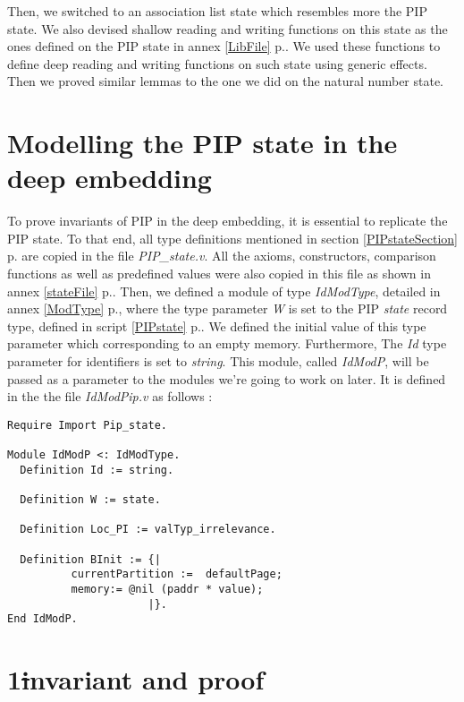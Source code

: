 Then, we switched to an association list state which resembles more the PIP state. We also devised shallow reading and writing functions on this state as the ones defined on the PIP state in annex \ref{LibFile} p.\pageref{LibFile}. We used these functions to define deep reading and writing functions on such state using generic effects. Then we proved similar lemmas to the one we did on the natural number state. 
 
\section{Modelling the PIP state in the deep embedding}
To prove invariants of PIP in the deep embedding, it is essential to replicate the PIP state. To that end, all type definitions mentioned in section \ref{PIPstateSection} p.\pageref{PIPstateSection} are copied in the file \textit{PIP\_state.v}. All the axioms, constructors, comparison functions as well as predefined values were also copied in this file as shown in annex \ref{stateFile} p.\pageref{stateFile}. Then, we defined a module of type \textit{IdModType}, detailed in annex \ref{ModType} p.\pageref{ModType}, where the type parameter \textit{W} is set to the PIP \textit{state} record type, defined in script \ref{PIPstate} p.\pageref{PIPstate}. We defined the initial value of this type parameter which corresponding to an empty memory. Furthermore, The \textit{Id} type parameter for identifiers is set to \textit{string}. This module, called \textit{IdModP}, will be passed as a parameter to the modules we're going to work on later. It is defined in the the file \textit{IdModPip.v} as follows :
\begin{lstlisting}[caption = {PIP state in the deep embedding}, xleftmargin=.1\textwidth,
xrightmargin=.1\textwidth]
Require Import Pip_state.

Module IdModP <: IdModType.
  Definition Id := string.
  
  Definition W := state.

  Definition Loc_PI := valTyp_irrelevance.

  Definition BInit := {|
          currentPartition :=  defaultPage;
          memory:= @nil (paddr * value);
                      |}.
End IdModP.
\end{lstlisting}

\section{1\st invariant and proof} 

